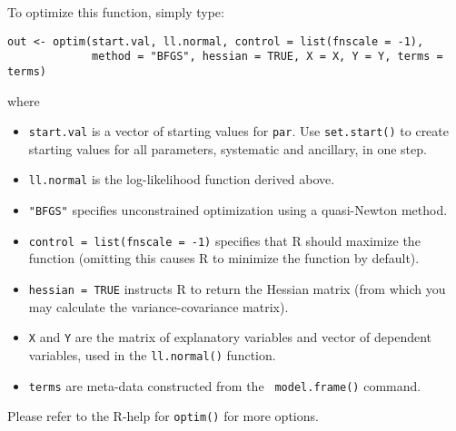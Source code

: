 To optimize this function, simply type:  
\begin{verbatim}
out <- optim(start.val, ll.normal, control = list(fnscale = -1),
             method = "BFGS", hessian = TRUE, X = X, Y = Y, terms = terms)
\end{verbatim}
where
\begin{itemize}
\item {\tt start.val} is a vector of starting values for {\tt par}.
Use {\tt set.start()} to create starting values for all parameters,
systematic and ancillary, in one step.  
\item {\tt ll.normal} is the log-likelihood function derived above.
\item {\tt "BFGS"} specifies unconstrained optimization using a
  quasi-Newton method.
\item {\tt control = list(fnscale = -1)} specifies that R should
  maximize the function (omitting this causes R to minimize the
  function by default).
\item {\tt hessian = TRUE} instructs R to return the Hessian matrix
  (from which you may calculate the variance-covariance matrix).
\item {\tt X} and {\tt Y} are the matrix of explanatory variables and
  vector of dependent variables, used in the {\tt ll.normal()}
  function.
\item {\tt terms} are meta-data constructed from the {\tt
model.frame()} command.  
\end{itemize}
Please refer to the R-help for {\tt optim()} for more options.

